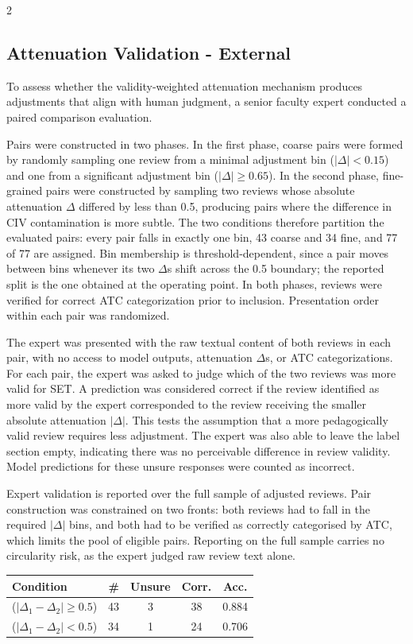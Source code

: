 \documentclass{article}
\begin{document}
\begin{multicols*}{2}
\subsection{Attenuation Validation - External}
To assess whether the validity-weighted attenuation mechanism produces adjustments that align with human judgment, a senior faculty expert conducted a paired comparison evaluation.

Pairs were constructed in two phases. In the first phase, coarse pairs were formed by randomly sampling one review from a minimal adjustment bin ($|\Delta| < 0.15$) and one from a significant adjustment bin ($|\Delta| \geq 0.65$). In the second phase, fine-grained pairs were constructed by sampling two reviews whose absolute attenuation $\Delta$ differed by less than 0.5, producing pairs where the difference in CIV contamination is more subtle. The two conditions therefore partition the evaluated pairs: every pair falls in exactly one bin, 43 coarse and 34 fine, and 77 of 77 are assigned. Bin membership is threshold-dependent, since a pair moves between bins whenever its two $\Delta$s shift across the 0.5 boundary; the reported split is the one obtained at the operating point. In both phases, reviews were verified for correct ATC categorization prior to inclusion. Presentation order within each pair was randomized.

The expert was presented with the raw textual content of both reviews in each pair, with no access to model outputs, attenuation $\Delta$s, or ATC categorizations. For each pair, the expert was asked to judge which of the two reviews  was more valid for SET. A prediction was considered correct if the review identified as more valid by the expert corresponded to the review receiving the smaller absolute attenuation $|\Delta|$. This tests the assumption that a more pedagogically valid review requires less adjustment. The expert was also able to leave the label section empty, indicating there was no perceivable difference in review validity. Model predictions for these unsure responses were counted as incorrect.

Expert validation is reported over the full sample of adjusted reviews. Pair construction was constrained on two fronts: both reviews had to fall in the required $|\Delta|$ bins, and both had to be verified as correctly categorised by ATC, which limits the pool of eligible pairs. Reporting on the full sample carries no circularity risk, as the expert judged raw review text alone.
\begin{center}
    \label{tab:external-validation}
    \begin{tabular}{lcccc}
    \hline
    \textbf{Condition} & \textbf{\#} & \textbf{Unsure} & \textbf{Corr.} & \textbf{Acc.} \\
    \hline
    ($|\Delta_{1}-\Delta_{2}| \geq 0.5$) & 43 & 3 & 38 & 0.884 \\
    ($|\Delta_{1}-\Delta_{2}| < 0.5$) & 34 & 1 & 24 & 0.706 \\
    \hline
    \end{tabular}
\end{center}


\end{multicols*}
\end{document}
